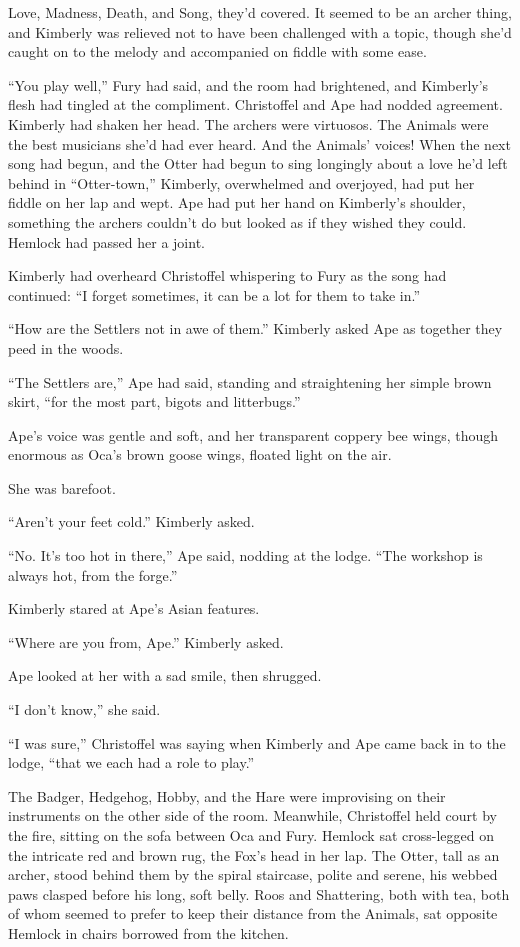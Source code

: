 \documentclass[11pt,a5paper]{article}
\begin{document}
Love, Madness, Death, and Song, they'd covered. It seemed to be an archer thing, and Kimberly was relieved not to have been challenged with a topic, though she'd caught on to the melody and accompanied on fiddle with some ease.

``You play well,'' Fury had said, and the room had brightened, and Kimberly's flesh had tingled at the compliment. Christoffel and Ape had nodded agreement. Kimberly had shaken her head. The archers were virtuosos. The Animals were the best musicians she'd had ever heard. And the Animals' voices! When the next song had begun, and the Otter had begun to sing longingly about a love he'd left behind in ``Otter-town,'' Kimberly, overwhelmed and overjoyed, had put her fiddle on her lap and wept. Ape had put her hand on Kimberly's shoulder, something the archers couldn't do but looked as if they wished they could. Hemlock had passed her a joint.

Kimberly had overheard Christoffel whispering to Fury as the song had continued: ``I forget sometimes, it can be a lot for them to take in.''



``How are the Settlers not in awe of them.'' Kimberly asked Ape as together they peed in the woods.

``The Settlers are,'' Ape had said, standing and straightening her simple brown skirt, ``for the most part, bigots and litterbugs.''

Ape's voice was gentle and soft, and her transparent coppery bee wings, though enormous as Oca's brown goose wings, floated light on the air.

She was barefoot.

``Aren't your feet cold.'' Kimberly asked.

``No. It's too hot in there,'' Ape said, nodding at the lodge. ``The workshop is always hot, from the forge.''

Kimberly stared at Ape's Asian features.

``Where are you from, Ape.'' Kimberly asked.

Ape looked at her with a sad smile, then shrugged.

``I don't know,'' she said.



``I was sure,'' Christoffel was saying when Kimberly and Ape came back in to the lodge, ``that we each had a role to play.''

The Badger, Hedgehog, Hobby, and the Hare were improvising on their instruments on the other side of the room. Meanwhile, Christoffel held court by the fire, sitting on the sofa between Oca and Fury. Hemlock sat cross-legged on the intricate red and brown rug, the Fox's head in her lap. The Otter, tall as an archer, stood behind them by the spiral staircase, polite and serene, his webbed paws clasped before his long, soft belly. Roos and Shattering, both with tea, both of whom seemed to prefer to keep their distance from the Animals, sat opposite Hemlock in chairs borrowed from the kitchen.
\end{document}
